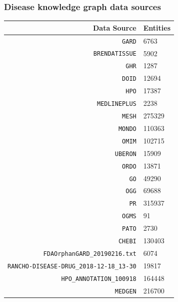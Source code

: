﻿\documentclass[anchorcolor=blue,linkcolor=blue]{beamer}
\begin{document}
\begin{frame}
  \frametitle{Disease knowledge graph data sources}
  \begin{center}
    \tiny
    \begin{tabular}{rl}\toprule
      Data Source & Entities\\ \midrule
      \texttt{GARD}&6763\\
      \texttt{BRENDATISSUE}&5902\\
      \texttt{GHR}&1287\\
      \texttt{DOID}&12694\\
      \texttt{HPO}&17387\\
      \texttt{MEDLINEPLUS}&2238\\
      \texttt{MESH}&275329\\
      \texttt{MONDO}&110363\\
      \texttt{OMIM}&102715\\
      \texttt{UBERON}&15909\\
      \texttt{ORDO}&13871\\
      \texttt{GO}&49290\\
      \texttt{OGG}&69688\\
      \texttt{PR}&315937\\
      \texttt{OGMS}&91\\
      \texttt{PATO}&2730\\
      \texttt{CHEBI}&130403\\
      \texttt{FDAOrphanGARD\_20190216.txt}&6074\\
      \texttt{RANCHO-DISEASE-DRUG\_2018-12-18\_13-30}&19817\\
      \texttt{HPO\_ANNOTATION\_100918}&164448\\
      \texttt{MEDGEN} &216700\\ \bottomrule
    \end{tabular}
  \end{center}
\end{frame}
\end{document}
